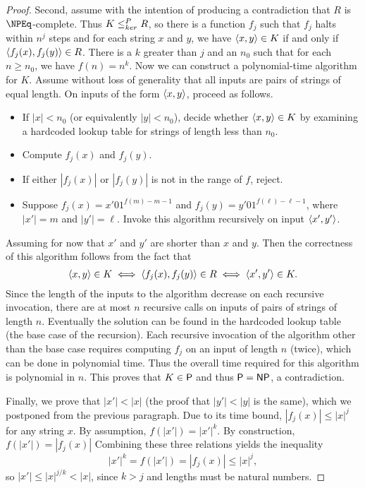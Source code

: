 \begin{proof}
  Second, assume with the intention of producing a contradiction that $R$ is $\NPEq$-complete.
  Thus $K \kr R$, so there is a function $f_j$ such that $f_j$ halts within $n^j$ steps and for each string $x$ and $y$, we have $\pair{x}{y} \in K$ if and only if $\pair{f_j(x)}{f_j(y)} \in R$.
  There is a $k$ greater than $j$ and an $n_0$ such that for each $n \geq n_0$, we have $f(n) = n^k$.
  Now we can construct a polynomial-time algorithm for $K$.
  Assume without loss of generality that all inputs are pairs of strings of equal length.
  On inputs of the form $\pair{x}{y}$, proceed as follows.
  \begin{itemize}
  \item If $|x| < n_0$ (or equivalently $|y| < n_0$), decide whether $\pair{x}{y} \in K$ by examining a hardcoded lookup table for strings of length less than $n_0$.
  \item Compute $f_j(x)$ and $f_j(y)$.
  \item If either $|f_j(x)|$ or $|f_j(y)|$ is not in the range of $f$, reject.
  \item
    Suppose $f_j(x) = x' 0 1^{f(m) - m - 1}$ and $f_j(y) = y' 0 1^{f(\ell) - \ell - 1}$, where $|x'| = m$ and $|y'| = \ell$.
    Invoke this algorithm recursively on input $\pair{x'}{y'}$.
  \end{itemize}

  Assuming for now that $x'$ and $y'$ are shorter than $x$ and $y$.
  Then the correctness of this algorithm follows from the fact that
  \begin{equation*}
    \pair{x}{y} \in K \iff \pair{f_j(x)}{f_j(y)} \in R \iff \pair{x'}{y'} \in K.
  \end{equation*}
  Since the length of the inputs to the algorithm decrease on each recursive invocation, there are at most $n$ recursive calls on inputs of pairs of strings of length $n$.
  Eventually the solution can be found in the hardcoded lookup table (the base case of the recursion).
  Each recursive invocation of the algorithm other than the base case requires computing $f_j$ on an input of length $n$ (twice), which can be done in polynomial time.
  Thus the overall time required for this algorithm is polynomial in $n$.
  This proves that $K \in \P$ and thus $\P = \NP$, a contradiction.

  Finally, we prove that $|x'| < |x|$ (the proof that $|y'| < |y|$ is the same), which we postponed from the previous paragraph.
  Due to its time bound, $|f_j(x)| \leq |x|^j$ for any string $x$.
  By assumption, $f(|x'|) = |x'|^k$.
  By construction, $f(|x'|) = |f_j(x)|$
  Combining these three relations yields the inequality
  \begin{equation*}
    |x'|^k = f(|x'|) = |f_j(x)| \leq |x|^j,
  \end{equation*}
  so $|x'| \leq |x|^{j / k} < |x|$, since $k > j$ and lengths must be natural numbers.
\end{proof}

